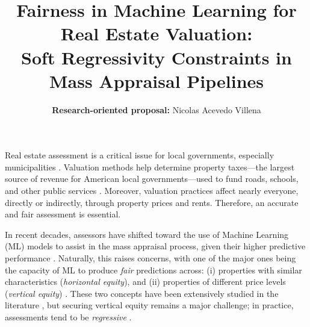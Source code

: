 \documentclass[11pt]{article}
\title{\vspace{-7mm}Fairness in Machine Learning for Real Estate Valuation:\\ Soft Regressivity Constraints in Mass Appraisal Pipelines \vspace{0mm}}
\author{\textbf{Research-oriented proposal:} Nicolas Acevedo Villena }
\date{
\vspace{-8mm}
}
\theoremstyle{plain}
\theoremstyle{definition}
\newcommand{\1}{\mathbf{1}}
\begin{document}
\maketitle


Real estate assessment is a critical issue for local governments, especially municipalities \cite{Rootetal2023}. Valuation methods help determine property taxes—the largest source of revenue for American local governments—used to fund roads, schools, and other public services \cite{Berry2021}. Moreover, valuation practices affect nearly everyone, directly or indirectly, through property prices and rents. Therefore, an accurate and fair assessment is essential.


In recent decades, assessors have shifted toward the use of Machine Learning (ML) models to assist in the mass appraisal process, given their higher predictive performance \cite{Rootetal2023, Ostrikova2024,Sevgen2024100111}. Naturally, this raises concerns, with one of the major ones being the capacity of ML to produce \textit{fair} predictions across: (i) properties with similar characteristics (\textit{horizontal equity}), and (ii) properties of different price levels (\textit{vertical equity}) \cite{quintos2014improving}. These two concepts have been extensively studied in the literature \cite{10578d49-78f8-3ef9-8277-9b6add2bd071,cornia2006property}, but securing vertical equity remains a major challenge; in practice, assessments tend to be \textit{regressive} \cite{McMillen2020}. 
\end{document}
